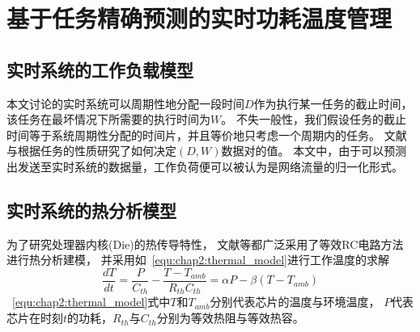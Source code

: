 


\chapter{基于任务精确预测的实时功耗温度管理}
\label{cha:DPTM}

\section{实时系统的工作负载模型}
\label{sec:workload}
本文讨论的实时系统可以周期性地分配一段时间$D$作为执行某一任务的截止时间，该任务在最坏情况下所需要的执行时间为$W$。 不失一般性，我们假设任务的截止时间等于系统周期性分配的时间片，并且等价地只考虑一个周期内的任务。 文献与根据任务的性质研究了如何决定$(D,W)$数据对的值。 本文中，由于可以预测出发送至实时系统的数据量，工作负荷便可以被认为是网络流量的归一化形式。


\section{实时系统的热分析模型}
\label{sec:thermal}
为了研究处理器内核(Die)的热传导特性， 文献等都广泛采用了等效RC电路方法进行热分析建模， 并采用如~\ref{equ:chap2:thermal_model}进行工作温度的求解
\begin{equation}
\label{equ:chap2:thermal_model}
\frac{dT}{dt} = \frac{P}{C_{th}}-\frac{T-T_{amb}}{R_{th}C_{th}} = \alpha P -\beta (T-T_{amb})
\end{equation}
~\ref{equ:chap2:thermal_model}式中$T$和$T_{amb}$分别代表芯片的温度与环境温度， $P$代表芯片在时刻$t$的功耗，$R_{th}$与$C_{th}$分别为等效热阻与等效热容。


